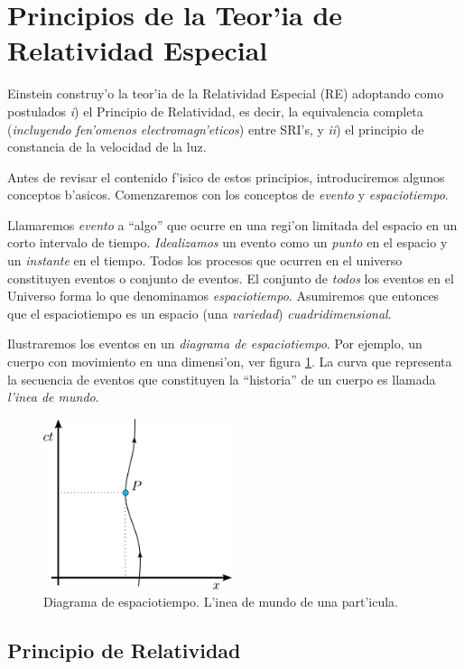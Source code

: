 \section{Principios de la Teor'ia de Relatividad Especial}
Einstein construy'o la teor'ia de la Relatividad Especial (RE) adoptando como postulados \textit{i}) el Principio de Relatividad, es decir, la equivalencia completa (\textit{incluyendo fen'omenos electromagn'eticos}) entre SRI's,  y \textit{ii}) el principio de constancia de la velocidad de la luz.

Antes de revisar el contenido f'isico de estos principios, introduciremos algunos conceptos b'asicos. Comenzaremos con los conceptos de \textit{evento} y \textit{espaciotiempo}.

Llamaremos \textit{evento} a ``algo'' que ocurre en una regi'on limitada del
espacio en un corto intervalo de tiempo. \textit{Idealizamos} un evento como un \textit{punto} en el espacio y un \textit{instante} en el tiempo. Todos los procesos que ocurren en el universo constituyen eventos o conjunto de eventos.
El conjunto de \textit{todos} los eventos en el Universo forma lo que
denominamos \textit{espaciotiempo}. Asumiremos que entonces que el espaciotiempo es un espacio (una \textit{variedad}) \textit{cuadridimensional}.

Ilustraremos los eventos en un \textit{diagrama de espaciotiempo}. Por ejemplo, un cuerpo con movimiento en una dimensi'on, ver figura \ref{TER1}. La curva que representa la secuencia de eventos que constituyen la ``historia'' de un cuerpo es llamada \textit{l'inea de mundo}.

\begin{figure}[!h]
\centerline{\includegraphics[height=5cm]{fig/fig-diagrama-espaciotiempo.pdf}}
\caption{Diagrama de espaciotiempo. L'inea de mundo de una part'icula.}
\label{TER1}
\end{figure}

\subsection{Principio de Relatividad}
\begin{quotation}
\end{quotation}


